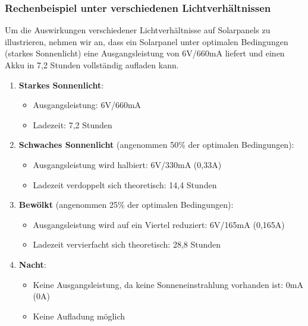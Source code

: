 \documentclass{vorlage-design-main}
\begin{document}
\hypertarget{rechenbeispiel-unter-verschiedenen-lichtverhuxe4ltnissen}{%
\subsubsection{Rechenbeispiel unter verschiedenen
Lichtverhältnissen}\label{rechenbeispiel-unter-verschiedenen-lichtverhaeltnissen}}

Um die Auswirkungen verschiedener Lichtverhältnisse auf Solarpanels zu
illustrieren, nehmen wir an, dass ein Solarpanel unter optimalen
Bedingungen (starkes Sonnenlicht) eine Ausgangsleistung von 6V/660mA
liefert und einen Akku in 7,2 Stunden vollständig aufladen kann.

\begin{enumerate}
\def\labelenumi{\arabic{enumi}.}

\item
  \textbf{Starkes Sonnenlicht}:

  \begin{itemize}
  
  \item
    Ausgangsleistung: 6V/660mA
  \item
    Ladezeit: 7,2 Stunden
  \end{itemize}
\item
  \textbf{Schwaches Sonnenlicht} (angenommen 50\% der optimalen
  Bedingungen):

  \begin{itemize}
  
  \item
    Ausgangsleistung wird halbiert: 6V/330mA (0,33A)
  \item
    Ladezeit verdoppelt sich theoretisch: 14,4 Stunden
  \end{itemize}
\item
  \textbf{Bewölkt} (angenommen 25\% der optimalen Bedingungen):

  \begin{itemize}
  
  \item
    Ausgangsleistung wird auf ein Viertel reduziert: 6V/165mA (0,165A)
  \item
    Ladezeit vervierfacht sich theoretisch: 28,8 Stunden
  \end{itemize}
\item
  \textbf{Nacht}:

  \begin{itemize}
  
  \item
    Keine Ausgangsleistung, da keine Sonneneinstrahlung vorhanden ist:
    0mA (0A)
  \item
    Keine Aufladung möglich
  \end{itemize}
\end{enumerate}
\end{document}
